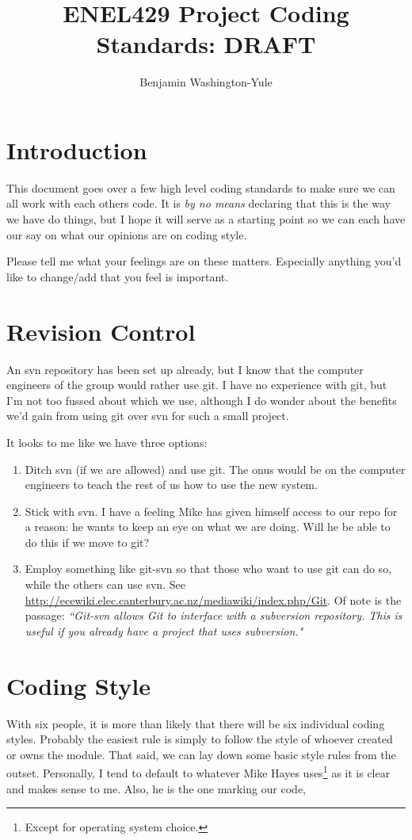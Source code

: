 \documentclass[10pt]{article}
\begin{document}
\title{ENEL429 Project Coding Standards: DRAFT}
\author{Benjamin Washington-Yule}
\maketitle

\section{Introduction}
This document goes over a few high level coding standards to make sure we can all work with each others code. It is \emph{by no means} declaring that this is the way we have do things, but I hope it will serve as a starting point so we can each have our say on what our opinions are on coding style.

Please tell me what your feelings are on these matters. Especially anything you'd like to change/add that you feel is important.

\section{Revision Control}
An svn repository has been set up already, but I know that the computer engineers of the group would rather use git. I have no experience with git, but I'm not too fussed about which we use, although I do wonder about the benefits we'd gain from using git over svn for such a small project.

It looks to me like we have three options:
\begin{enumerate}
  \item Ditch svn (if we are allowed) and use git. The onus would be on the computer engineers to teach the rest of us how to use the new system.
  \item Stick with svn. I have a feeling Mike has given himself access to our repo for a reason: he wants to keep an eye on what we are doing. Will he be able to do this if we move to git?
  \item Employ something like git-svn so that those who want to use git can do so, while the others can use svn. See \url{http://ecewiki.elec.canterbury.ac.nz/mediawiki/index.php/Git}. Of note is the passage: \emph{``Git-svn allows Git to interface with a subversion repository. This is useful if you already have a project that uses subversion."}
\end{enumerate}

\section{Coding Style}
With six people, it is more than likely that there will be six individual coding styles. Probably the easiest rule is simply to follow the style of whoever created or owns the module. That said, we can lay down some basic style rules from the outset. Personally, I tend to default to whatever Mike Hayes uses\footnote{Except for operating system choice.} as it is clear and makes sense to me. Also, he is the one marking our code,
\end{document}
